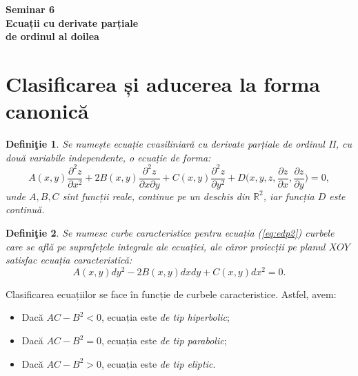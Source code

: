\documentclass[11pt,a4paper]{article}
\newcommand\RR{\mathbb{R}}
\theoremstyle{dotless}
\theoremstyle{dotlessdr}
\newtheorem{definition}{Defini\c{t}ie}[section]
\begin{document}

\begin{center}
  {\large\textbf{Seminar 6 \\
      Ecuații cu derivate parțiale \\
      de ordinul al doilea}}
\end{center}

\vspace{2cm}

\section{Clasificarea și aducerea la forma canonică}

\begin{definition}\label{def:edp2}
  Se numește \emph{ecuație cvasiliniară cu derivate parțiale de ordinul II},
  cu două variabile independente, o ecuație de forma:
  \begin{equation}
    \label{eq:edp2}
    A(x, y) \frac{\partial^2 z}{\partial x^2} + %
    2B(x, y) \frac{\partial^2 z}{\partial x \partial y} + %
    C(x, y) \frac{\partial^2 z}{\partial y^2} + %
    D\Big(x, y, z, \frac{\partial z}{\partial x}, \frac{\partial z}{\partial y}\Big) = 0,
  \end{equation}
  unde $ A, B, C $ sînt funcții reale, continue pe un deschis din $ \RR^2 $, iar funcția
  $ D $ este continuă.
\end{definition}

\begin{definition}\label{def:curbe-car}
  Se numesc \emph{curbe caracteristice} pentru ecuația (\ref{eq:edp2}) curbele care
  se află pe suprafețele integrale ale ecuației, ale căror proiecții pe planul $ XOY $
  satisfac \emph{ecuația caracteristică}:
  \begin{equation}
    \label{eq:ec-car}
    A(x, y) dy^2 - 2B(x, y) dxdy + C(x, y) dx^2 = 0.
  \end{equation}
\end{definition}

Clasificarea ecuațiilor se face în funcție de curbele caracteristice. Astfel, avem:
\begin{itemize}
\item Dacă $ AC - B^2 < 0 $, ecuația este \emph{de tip hiperbolic};
\item Dacă $ AC - B^2 = 0 $, ecuația este \emph{de tip parabolic};
\item Dacă $ AC - B^2 > 0 $, ecuația este \emph{de tip eliptic}.
\end{itemize}
\end{document}
